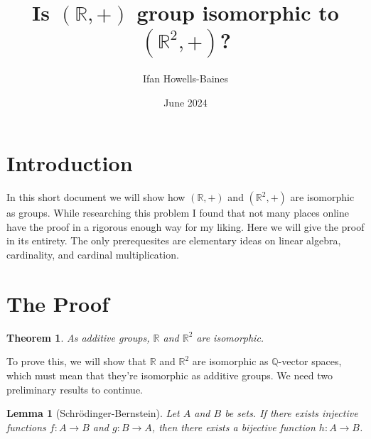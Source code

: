 \documentclass[12pt]{article}
\title{Is $(\mathbb{R},+)$ group isomorphic to $(\mathbb{R}^2,+)$?}
\author{Ifan Howells-Baines}
\date{June 2024}
\newtheorem*{theorem}{Theorem}
\newtheorem{lemma}{Lemma}
\begin{document}
\maketitle

\section*{Introduction}
\label{sec:intro}

In this short document we will show how $(\mathbb{R},+)$ and $(\mathbb{R}^2,+)$ are isomorphic as groups. While researching this problem I found that not many places online have the proof in a rigorous enough way for my liking. Here we will give the proof in its entirety. The only prerequesites are elementary ideas on linear algebra, cardinality, and cardinal multiplication.

\section*{The Proof}
\label{sec:the-proof}

\begin{theorem}
  As additive groups, $\mathbb{R}$ and $\mathbb{R}^2$ are isomorphic.
\end{theorem}

To prove this, we will show that $\mathbb{R}$ and $\mathbb{R}^2$ are
isomorphic as $\mathbb{Q}$-vector spaces, which must mean that they're
isomorphic as additive groups. We need two preliminary results to
continue.

\begin{lemma}[Schr\"{o}dinger-Bernstein]
  \label{lem:schr-bern}
  Let $A$ and $B$ be sets. If there exists injective functions
  $f:A \to B$ and $g:B \to A$, then there exists a bijective function
  $h: A \to B$.
\end{lemma}
\end{document}
